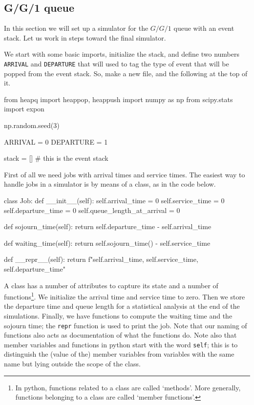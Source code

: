 \documentclass{scrartcl}
\begin{document}
\subsection{G/G/1 queue}
\label{sec:gg1-queue}

In this section we will set up a simulator for the $G/G/1$ queue with  an event stack. Let us work in steps toward the final simulator.

We start with some basic imports,  initialize the stack,  and define two numbers \texttt{ARRIVAL} and \texttt{DEPARTURE} that will used to tag the type of event that will be popped from the event stack. So, make a new file, and the following at the  top of it.

\begin{pyblock}
from heapq import heappop, heappush
import numpy as np 
from scipy.stats import  expon

np.random.seed(3)

ARRIVAL = 0
DEPARTURE = 1

stack = [] # this is the event stack
\end{pyblock}


First of all we need jobs with arrival times and service times. The easiest way to handle jobs in a simulator is by means of a class, as in the code below.


\begin{pyblock}
class Job:
    def __init__(self):
        self.arrival_time = 0
        self.service_time = 0
        self.departure_time = 0
        self.queue_length_at_arrival = 0

    def sojourn_time(self):
        return self.departure_time - self.arrival_time

    def waiting_time(self):
        return self.sojourn_time() - self.service_time

    def __repr__(self):
        return f"{self.arrival_time}, {self.service_time}, {self.departure_time}\n"

  
\end{pyblock}

A class has a number of attributes to capture its  state and a number of functions\footnote{In python, functions related to a class are called `methods'. More generally, functions belonging to a class are called `member functions'.}. We initialize the arrival time and service time to zero. Then we store the departure time and queue length for a statistical analysis at the end of the simulations. Finally, we have functions to compute the waiting time and the sojourn time; the \texttt{repr} function is used to print the job. Note that our naming of functions also acts as documentation of what the functions do. Note also that member variables and functions in python start with the word \texttt{self}; this is to distinguish the (value of the) member variables from variables with the same name but lying outside the scope of the class.
\end{document}
